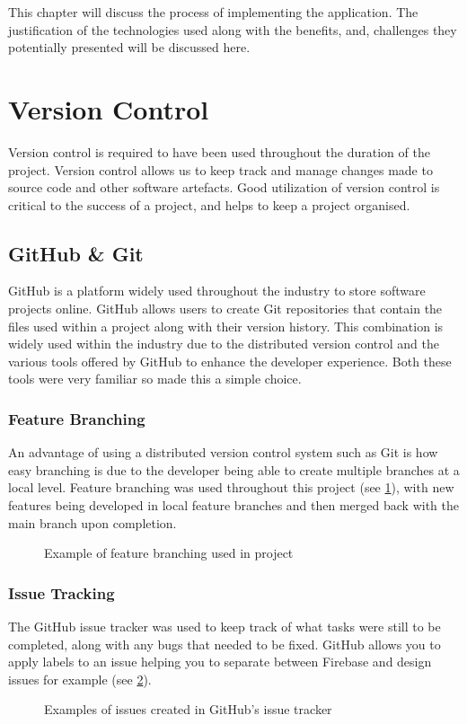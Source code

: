 \usepackage{listings}
This chapter will discuss the process of implementing the application. The justification of the technologies used along with the benefits, and, challenges they potentially presented will be discussed here.

\section{Version Control}
Version control is required to have been used throughout the duration of the project. Version control allows us to keep track and manage changes made to source code and other software artefacts. Good utilization of version control is critical to the success of a project, and helps to keep a project organised.
\subsection{GitHub \& Git}
GitHub \cite{github} is a platform widely used throughout the industry to store software projects online. GitHub allows users to create Git repositories \cite{git} that contain the files used within a project along with their version history. This combination is widely used within the industry due to the distributed version control and the various tools offered by GitHub to enhance the developer experience. Both these tools were very familiar so made this a simple choice. 
\subsubsection{Feature Branching}
An advantage of using a distributed version control system such as Git is how easy branching is due to the developer being able to create multiple branches at a local level. Feature branching was used throughout this project (see \ref{fig:branching}), with new features being developed in local feature branches and then merged back with the main branch upon completion.  
\begin{figure}[!htbp]
    \centering
    \begin{subfigure}[b]{0.90\textwidth}
    \end{subfigure}
    \caption{Example of feature branching used in project}
    \label{fig:branching}
\end{figure}
\subsubsection{Issue Tracking}
The GitHub issue tracker was used to keep track of what tasks were still to be completed, along with any bugs that needed to be fixed. GitHub allows you to apply labels to an issue helping you to separate between Firebase and design issues for example (see \ref{fig:issues}).
\begin{figure}[!htbp]
    \centering
    \begin{subfigure}[b]{0.90\textwidth}
    \end{subfigure}
    \caption{Examples of issues created in GitHub's issue tracker}
    \label{fig:issues}
\end{figure}
